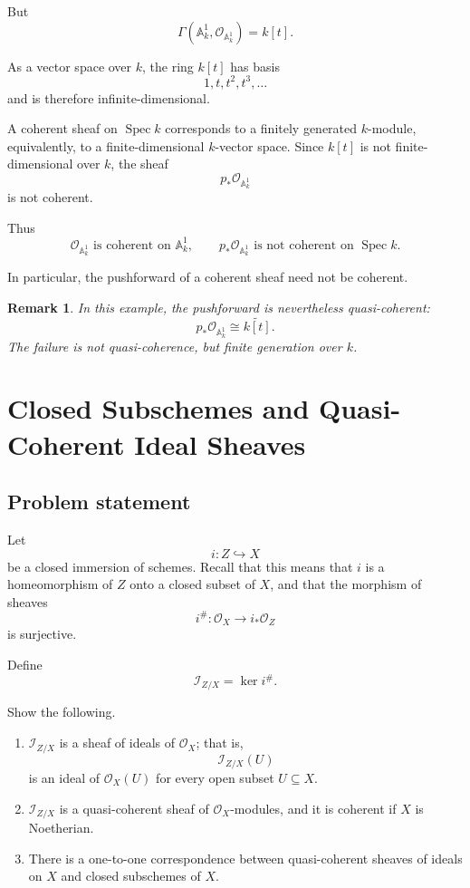 \documentclass[12pt,a4paper]{article}
\DeclareMathOperator{\Spec}{Spec}
\newcommand{\OO}{\mathcal{O}}
\providecommand{\Spec}{\operatorname{Spec}}
\providecommand{\A}{\mathbb A}
\theoremstyle{notespace}
\newtheorem{remark}[definition]{Remark}
\begin{document}
But
\[
\Gamma(\A^1_k,\OO_{\A^1_k})
=
k[t].
\]

As a vector space over \(k\), the ring \(k[t]\) has basis
\[
1,t,t^2,t^3,\dots
\]
and is therefore infinite-dimensional.

A coherent sheaf on \(\Spec k\) corresponds to a finitely generated \(k\)-module, equivalently, to a finite-dimensional \(k\)-vector space. Since \(k[t]\) is not finite-dimensional over \(k\), the sheaf
\[
p_*\OO_{\A^1_k}
\]
is not coherent.

Thus
\[
\boxed{
	\OO_{\A^1_k}\text{ is coherent on }\A^1_k,
	\qquad
	p_*\OO_{\A^1_k}\text{ is not coherent on }\Spec k.
}
\]

In particular, the pushforward of a coherent sheaf need not be coherent.

\begin{remark}
	In this example, the pushforward is nevertheless quasi-coherent:
	\[
	p_*\OO_{\A^1_k}\cong \widetilde{k[t]}.
	\]
	The failure is not quasi-coherence, but finite generation over \(k\).
\end{remark}

\section{Closed Subschemes and Quasi-Coherent Ideal Sheaves}

\subsection*{Problem statement}

Let
\[
i:Z\hookrightarrow X
\]
be a closed immersion of schemes. Recall that this means that \(i\) is a homeomorphism of \(Z\) onto a closed subset of \(X\), and that the morphism of sheaves
\[
i^\#:\OO_X\longrightarrow i_*\OO_Z
\]
is surjective.

Define
\[
\mathcal{I}_{Z/X}=\ker i^\#.
\]

Show the following.

\begin{enumerate}[label=(\alph*)]
	\item \(\mathcal{I}_{Z/X}\) is a sheaf of ideals of \(\OO_X\); that is,
	\[
	\mathcal{I}_{Z/X}(U)
	\]
	is an ideal of \(\OO_X(U)\) for every open subset \(U\subseteq X\).
	
	\item \(\mathcal{I}_{Z/X}\) is a quasi-coherent sheaf of \(\OO_X\)-modules, and it is coherent if \(X\) is Noetherian.
	
	\item There is a one-to-one correspondence between quasi-coherent sheaves of ideals on \(X\) and closed subschemes of \(X\).
\end{enumerate}
\end{document}
